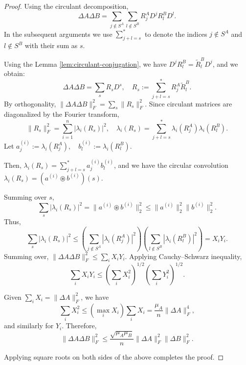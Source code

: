\documentclass[onefignum,onetabnum]{siamart171218}
\begin{document}
\begin{proof}
Using the circulant decomposition,
\[
\Delta A \Delta B
=
\sum_{j \notin S^A} \sum_{l \notin S^B}
R_j^A D^j R_l^B D^l.
\]
In the subsequent arguments we use $\sum_{j+l = s}^*$ to denote the indices $j \notin S^A$ and $l \notin S^B$ with their sum as $s$. 

Using the Lemma \ref{lem:circulant-conjugation}, we have $D^j R_l^B = \tilde{R}_l^B D^j$, and we obtain:
\[
\Delta A \Delta B
=
\sum_s R_s D^s,
\quad
R_s := \sum_{j+l=s}^* R_j^A \tilde{R}_l^B.
\]
By orthogonality, $\|\Delta A \Delta B\|_F^2 = \sum_s \|R_s\|_F^2.$ Since circulant matrices are diagonalized by the Fourier transform,
\[
\|R_s\|_F^2 = \sum_{i=1}^n |\lambda_i(R_s)|^2,
\quad
\lambda_i(R_s) = \sum_{j+l=s}^* \lambda_i(R_j^A)\lambda_i(R_l^B).
\]
Let $a_j^{(i)} := \lambda_i(R_j^A),
\quad b_l^{(i)} := \lambda_i(R_l^B).$

Then, $\lambda_i(R_s) = \sum_{j+l=s}^* a_j^{(i)} b_l^{(i)}$, and we have the circular convolution $\lambda_i(R_s) = (a^{(i)} \circledast b^{(i)})(s)$. 

Summing over $s$,
\[
\sum_s |\lambda_i(R_s)|^2
=
\|a^{(i)} \circledast b^{(i)}\|_2^2
\le
\|a^{(i)}\|_2^2 \|b^{(i)}\|_2^2.
\]
Thus,
\[
\sum_s |\lambda_i(R_s)|^2
\le
\left(\sum_{j \notin S^A} |\lambda_i(R_j^A)|^2\right)
\left(\sum_{l \notin S^B} |\lambda_i(R_l^B)|^2\right)
= X_i Y_i.
\]
Summing over, $\|\Delta A \Delta B\|_F^2
\le \sum_i X_i Y_i.$ Applying Cauchy--Schwarz inequality,
\[
\sum_i X_i Y_i
\le
\left(\sum_i X_i^2\right)^{1/2}
\left(\sum_i Y_i^2\right)^{1/2}.
\]

Given $\sum_i X_i = \|\Delta A\|_F^2$, we have
\[
\sum_i X_i^2 \le (\max_i X_i)\sum_i X_i
=
\frac{\mu_A}{n}\|\Delta A\|_F^4,
\]
and similarly for $Y_i$. Therefore,
\[
\|\Delta A \Delta B\|_F^2
\le
\frac{\sqrt{\mu_A \mu_B}}{n}
\|\Delta A\|_F^2 \|\Delta B\|_F^2.
\]

Applying square roots on both sides of the above completes the proof.
\end{proof}
\end{document}
